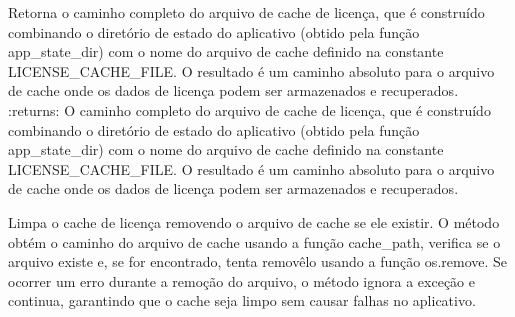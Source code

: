 \documentclass[letterpaper,10pt,english]{sphinxmanual}
\begin{document}
\begin{fulllineitems}
\label{\detokenize{api/online_license:online_license.cache_path}}
\pysigstartsignatures
\pysiglinewithargsret
{}
{}
{}
\pysigstopsignatures
\sphinxAtStartPar
Retorna o caminho completo do arquivo de cache de licença, que é construído combinando o diretório de estado do aplicativo (obtido pela função app\_state\_dir) com o nome do arquivo de cache definido na constante LICENSE\_CACHE\_FILE. O resultado é um caminho absoluto para o arquivo de cache onde os dados de licença podem ser armazenados e recuperados.
:returns: O caminho completo do arquivo de cache de licença, que é construído combinando o diretório de estado do aplicativo (obtido pela função app\_state\_dir) com o nome do arquivo de cache definido na constante LICENSE\_CACHE\_FILE. O resultado é um caminho absoluto para o arquivo de cache onde os dados de licença podem ser armazenados e recuperados.
\begin{quote}\begin{description}
\sphinxAtStartPar
{}

\end{description}\end{quote}

\end{fulllineitems}


\begin{fulllineitems}
\label{\detokenize{api/online_license:online_license.clear_cache}}
\pysigstartsignatures
\pysiglinewithargsret
{}
{}
{}
\pysigstopsignatures
\sphinxAtStartPar
Limpa o cache de licença removendo o arquivo de cache se ele existir. O método obtém o caminho do arquivo de cache usando a função cache\_path, verifica se o arquivo existe e, se for encontrado, tenta removê\sphinxhyphen{}lo usando a função os.remove. Se ocorrer um erro durante a remoção do arquivo, o método ignora a exceção e continua, garantindo que o cache seja limpo sem causar falhas no aplicativo.
\begin{quote}\begin{description}
\sphinxAtStartPar
{}

\end{description}\end{quote}

\end{fulllineitems}
\end{document}
